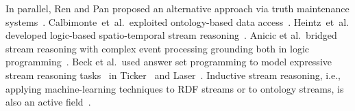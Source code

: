 In parallel, Ren and Pan
proposed an alternative approach via truth maintenance
systems~\cite{Ren2011}. Calbimonte~et~al.\ exploited ontology-based data access~\cite{DBLP:conf/esws/CalbimonteMC16}.
Heintz~et~al. developed logic-based spatio-temporal stream
reasoning~\cite{DeLengHeintz2016AAAI}.  Anicic
et al.\ bridged stream reasoning with complex event processing
grounding both in logic
programming~\cite{DBLP:journals/semweb/AnicicRFS12}. Beck et al.\ used
answer set programming to model expressive stream reasoning
tasks~\cite{DBLP:conf/aaai/BeckDEF15} in
Ticker~\cite{DBLP:journals/tplp/BeckEB17} and
Laser~\cite{DBLP:conf/semweb/BazoobandiBU17}.  Inductive stream
reasoning, i.e., applying machine-learning techniques to RDF streams
or to ontology streams, is also an active
field~\cite{DBLP:journals/expert/BarbieriBCVHTRW10,DBLP:conf/ijcai/ChenLPC17,DBLP:conf/ijcai/LecueP13}.
